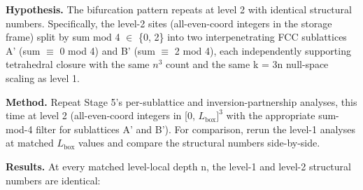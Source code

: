 \documentclass[11pt,oneside]{report}
\theoremstyle{definition}
\theoremstyle{remark}
\begin{document}
\textbf{Hypothesis.} The bifurcation pattern repeats at level 2 with
identical structural numbers. Specifically, the level-2 sites
(all-even-coord integers in the storage frame) split by sum mod 4 \ensuremath{\in} \{0,
2\} into two interpenetrating FCC sublattices A' (sum \ensuremath{\equiv} 0 mod 4) and B'
(sum \ensuremath{\equiv} 2 mod 4), each independently supporting tetrahedral closure with
the same \ensuremath{n^{3}} count and the same k = 3n null-space scaling as level 1.

\textbf{Method.} Repeat Stage 5's per-sublattice and
inversion-partnership analyses, this time at level 2 (all-even-coord
integers in [0, \ensuremath{L_{\mathrm{box}}]^{3}} with the appropriate sum-mod-4 filter for
sublattices A' and B'). For comparison, rerun the level-1 analyses at
matched \ensuremath{L_{\mathrm{box}}} values and compare the structural numbers side-by-side.

\textbf{Results.} At every matched level-local depth n, the level-1 and
level-2 structural numbers are identical:
\end{document}
